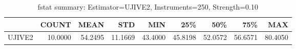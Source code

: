 \begin{table}[ht]
\centering
\caption{fstat summary: Estimator=UJIVE2, Instruments=250, Strength=0.10}
\begin{tabular}{lrrrrrrrr}
\toprule
 & COUNT & MEAN & STD & MIN & 25\% & 50\% & 75\% & MAX \\
\midrule
UJIVE2 & 10.0000 & 54.2495 & 11.1669 & 43.4000 & 45.8198 & 52.0572 & 56.6571 & 80.4050 \\
\bottomrule
\end{tabular}
\end{table}
